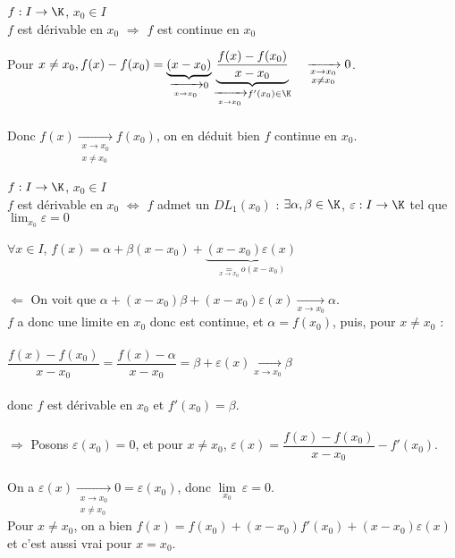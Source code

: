\documentclass[12pt,a4paper]{report}
\begin{document}
\begin{proposition}{}{}
$f:I\to \K$, $x_0 \in I$\\
$f$ est dérivable en $x_0$ $\Longrightarrow$ $f$ est continue en $x_0$
\end{proposition}

\begin{demo}{}
Pour $x \neq x_0, f(x) - f(x_0) = \underbrace{(x-x_0)}_{\xrightarrow[x \to x_0]{} 0} \underbrace{\dfrac{f(x)-f(x_0)}{x-x_0}}_{\xrightarrow[x \to x_0]{} f'(x_0) \in \K} \quad \xrightarrow[\substack{x \to x_0 \\ x \neq x_0} ]{} 0$. \\ \\
Donc $f(x) \xrightarrow[\substack{x \to x_0 \\ x \neq x_0}]{} f(x_0)$, on en déduit bien $f$ continue en $x_0$.
\end{demo}

\begin{proposition}{}{}
$f : I \to \K$, $x_0 \in I$\\
$f$ est dérivable en $x_0$ $\Longleftrightarrow$ $f$ admet un $DL_1 (x_0)$ : $\exists \alpha, \beta \in \K$, $\varepsilon : I \to \K$ tel que $\displaystyle\lim_{x_0} \varepsilon = 0$
\begin{center}
    $\forall x \in I$, $f(x) = \alpha + \beta (x-x_0) + \underbrace{(x-x_0) \varepsilon (x)}_{\underset{x \to x_0}{=} o(x-x_0)}$
\end{center}
\end{proposition}

\begin{demo}{}
$\Longleftarrow$ On voit que $\alpha+(x-x_0)\beta + (x-x_0)\varepsilon(x) \xrightarrow[x \to x_0]{} \alpha$. \\
$f$ a donc une limite en $x_0$ donc est continue, et $\alpha = f(x_0)$, puis, pour $x \neq x_0$ : \\ \\
$\dfrac{f(x)-f(x_0)}{x-x_0} = \dfrac{f(x)-\alpha}{x-x_0} = \beta + \varepsilon(x) \xrightarrow[x \to x_0]{} \beta$ \\ \\
donc $f$ est dérivable en $x_0$ et $f'(x_0) = \beta$. \\ \\
$\Longrightarrow$ Posons $\varepsilon(x_0) = 0$, et pour $x \neq x_0$, $\varepsilon(x) = \dfrac{f(x)-f(x_0)}{x-x_0}-f'(x_0)$. \\ \\
On a $\varepsilon(x) \xrightarrow[\substack{x \to x_0 \\ x \neq x_0}]{} 0 = \varepsilon(x_0)$, donc $\underset{x_0}{\lim} \: \varepsilon = 0$. \\
Pour $x \neq x_0$, on a bien $f(x) = f(x_0) + (x-x_0)f'(x_0)+(x-x_0)\varepsilon(x)$ et c'est aussi vrai pour $x=x_0$.
\end{demo}
\end{document}
